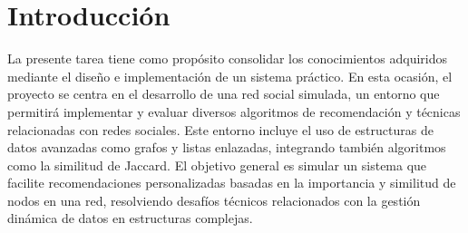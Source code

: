 \section{Introducción}
La presente tarea tiene como propósito consolidar los conocimientos adquiridos mediante el diseño e implementación de un sistema práctico. En esta ocasión, el proyecto se centra en el desarrollo de una red social simulada, un entorno que permitirá implementar y evaluar diversos algoritmos de recomendación y técnicas relacionadas con redes sociales. Este entorno incluye el uso de estructuras de datos avanzadas como grafos y listas enlazadas, integrando también algoritmos como la similitud de Jaccard. El objetivo general es simular un sistema que facilite recomendaciones personalizadas basadas en la importancia y similitud de nodos en una red, resolviendo desafíos técnicos relacionados con la gestión dinámica de datos en estructuras complejas.